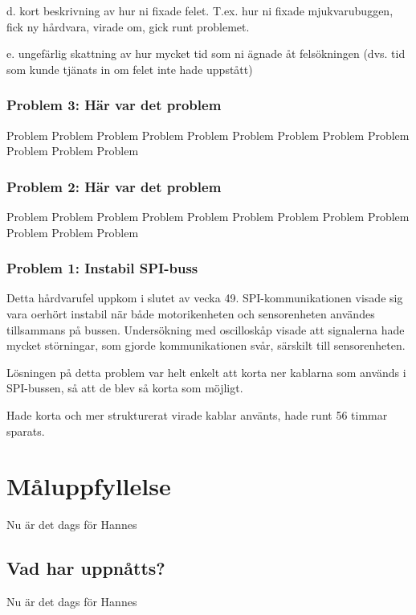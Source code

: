 \documentclass[a4paper,titlepage,12pt]{article}
\begin{document}
	d. kort beskrivning av hur ni fixade felet. T.ex. hur ni fixade mjukvarubuggen, fick ny hårdvara, virade om, gick runt problemet.

	e. ungefärlig skattning av hur mycket tid som ni ägnade åt felsökningen (dvs. tid som kunde tjänats in om felet inte hade uppstått)
	

    \subsubsection{Problem 3: Här var det problem}

    Problem     Problem     Problem     Problem     Problem     Problem
    Problem     Problem     Problem     Problem     Problem     Problem 

    \subsubsection{Problem 2: Här var det problem}

    Problem     Problem     Problem     Problem     Problem     Problem
    Problem     Problem     Problem     Problem     Problem     Problem 

    \subsubsection{Problem 1: Instabil SPI-buss}

    Detta hårdvarufel uppkom i slutet av vecka 49. SPI-kommunikationen visade
    sig vara oerhört instabil när både motorikenheten och sensorenheten
    användes tillsammans på bussen. Undersökning med oscilloskåp visade att
    signalerna hade mycket störningar, som gjorde kommunikationen svår,
    särskilt till sensorenheten.

    Lösningen på detta problem var helt enkelt att korta ner kablarna som
    används i SPI-bussen, så att de blev så korta som möjligt.

    Hade korta och mer strukturerat virade kablar använts, hade runt 56 timmar
    sparats. %

	\section{Måluppfyllelse}
	Nu är det dags för Hannes
	
	\subsection{Vad har uppnåtts?}
	Nu är det dags för Hannes
	
\end{document}
